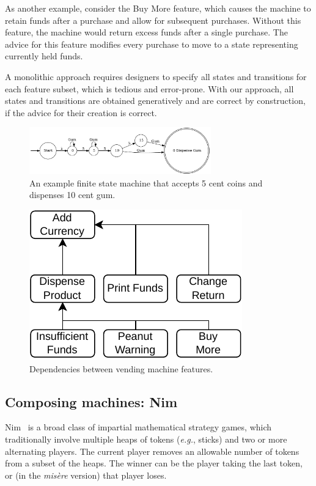 \documentclass[sigplan,anonymous,review]{acmart}
\begin{document}
As another example, consider the Buy More feature, which causes the machine to retain funds after a purchase and allow for subsequent purchases.  Without this feature, the machine would return excess funds after a single purchase.  The advice for this feature modifies every purchase to move to a state representing currently held funds.

A monolithic approach requires designers to specify all states and transitions for each feature subset, which is tedious and error-prone. With our approach, all states and transitions are obtained generatively and are correct by construction, if the advice for their creation is correct.

\begin{figure}
    \centering
    \includegraphics[width=0.7\textwidth]{figures/vend1.pdf}
    \caption{An example finite state machine that accepts 5 cent coins and dispenses 10 cent gum.}
    \label{fig:vend1}
\end{figure}

\begin{figure}
    \centering
    \includegraphics[width=0.5\linewidth]{figures/VendingMachine.pdf}
    \caption{Dependencies between vending machine features.}
    \label{fig:vmDependencies}
\end{figure}

\subsection{Composing machines: Nim}

Nim~\cite{nim} is a broad class of impartial mathematical strategy games, which traditionally involve multiple heaps of tokens (\textit{e.g.}, sticks) and two or more alternating players. The current player removes an allowable number of tokens from a subset of the heaps. The winner can be the player taking the last token, or (in the \textit{mis\`{e}re} version) that player loses.
\end{document}
